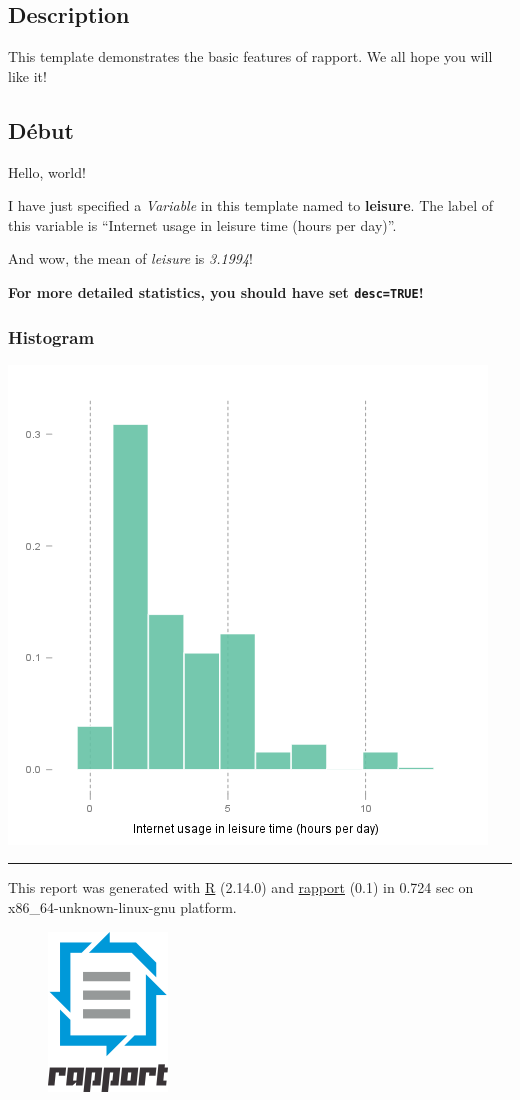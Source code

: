 \documentclass[]{article}
\makeatletter
\def\maxwidth{\ifdim\Gin@nat@width>\linewidth\linewidth
\else\Gin@nat@width\fi}
\let\Oldincludegraphics\includegraphics
\renewcommand{\includegraphics}[1]{\Oldincludegraphics[width=\maxwidth]{#1}}
\makeatother
\begin{document}
\subsection{Description}

This template demonstrates the basic features of rapport. We all hope
you will like it!

\subsection{Début}

Hello, world!

I have just specified a \emph{Variable} in this template named to
\textbf{leisure}. The label of this variable is ``Internet usage in
leisure time (hours per day)''.

And wow, the mean of \emph{leisure} is \emph{3.1994}!

\textbf{For more detailed statistics, you should have set
\texttt{desc=TRUE}!}

\subsubsection{Histogram}

\href{7779958734926ffb57756d6c1d01b75b-hires.png}{\includegraphics{7779958734926ffb57756d6c1d01b75b.png}}

\begin{center}\rule{3in}{0.4pt}\end{center}

This report was generated with \href{http://www.r-project.org/}{R}
(2.14.0) and \href{http://al3xa.github.com/rapport/}{rapport} (0.1) in
0.724 sec on x86\_64-unknown-linux-gnu platform.

\begin{figure}[htbp]
\centering
\includegraphics{images/logo.png}
\caption{}
\end{figure}
\end{document}
